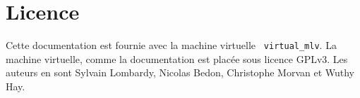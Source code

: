 \documentclass[12pt,a4]{article}
\begin{document}
\section{Licence}
Cette documentation est fournie avec la machine virtuelle {\tt
  virtual\_mlv}. La machine virtuelle, comme la documentation est
placée sous licence GPLv3. Les auteurs en sont Sylvain Lombardy,
Nicolas Bedon, Christophe Morvan et Wuthy Hay.
\end{document}
